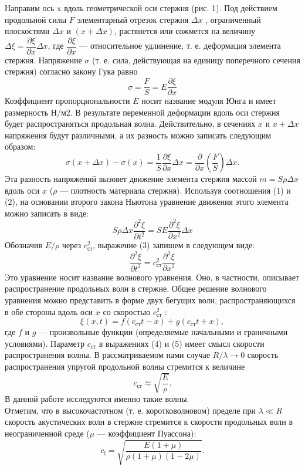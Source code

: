 \documentclass[a4paper, 10pt]{article}%
\begin{document}
Направим ось x вдоль геометрической оси стержня (рис. 1).
Под действием
продольной силы $F$ элементарный отрезок стержня $\Delta x$ , ограниченный
плоскостями $\Delta x$ и $(x+\Delta x)$, растянется или сожмется на величину $\Delta\xi=\dfrac{\partial\xi}{\partial x}\Delta x$, где $\dfrac{\partial\xi}{\partial x}$ — относительное удлинение, т. е. деформация элемента стержня. Напряжение $\sigma$ (т. е. сила, действующая на единицу поперечного
сечения стержня) согласно закону Гука равно
\begin{equation}
\sigma=\frac{F}{S}=E\dfrac{\partial\xi}{\partial x}
\end{equation}
Коэффициент пропорциональности $E$ носит название модуля Юнга и имеет размерность Н/м2. В результате переменной деформации вдоль оси стержня будет распространяться
продольная волна. Действительно, в сечениях $x$ и $x+\Delta x$
напряжения будут различными, а их разность можно записать следующим
образом: 
\begin{equation}
\sigma(x+\Delta x)-\sigma(x)=\frac{1}{S}\dfrac{\partial\xi}{\partial x}\Delta x=\frac{\partial}{\partial x}\left(\frac{F}{S}\right)\Delta x.
\end{equation}
Эта разность напряжений вызовет движение элемента стержня массой
$m=S\rho\Delta x$ вдоль оси $x$ ($\rho$ — плотность материала стержня). Используя
соотношения (1) и (2), на основании второго закона Ньютона уравнение
движения этого элемента можно записать в виде: 
\begin{equation}
S\rho\Delta x\dfrac{\partial^2\xi}{\partial t^2}=SE\dfrac{\partial^2\xi}{\partial x^2}\Delta x
\end{equation}
Обозначив $E/\rho$ через $c^2_{\text{ст}}$, выражение (3) запишем в следующем виде: 
\begin{equation}
\dfrac{\partial^2\xi}{\partial t^2}=c^2_{\text{ст}}\dfrac{\partial^2\xi}{\partial x^2}
\end{equation}
Это уравнение носит название волнового  уравнения. Оно, в частности,
описывает распространение продольных волн в стержне. Общее решение
волнового уравнения можно представить в форме двух бегущих волн, распространяющихся в обе стороны вдоль оси $x$ со скоростью
$c^2_{\text{ст}}$ :
\begin{equation}
\xi(x,t)=f(c_{\text{ст}}t-x)+g(c_{\text{ст}}t+x),
\end{equation}
где $f$ и $g$ — произвольные функции (определяемые начальными и граничными
условиями).
Параметр $c_{\text{ст}}$ в выражениях (4) и (5) имеет смысл скорости распространения волны. В рассматриваемом нами случае $R/\lambda\rightarrow 0$ скорость распространения
упругой продольной волны стремится к величине
\begin{equation}
c_{\text{ст}}\approx\sqrt{\dfrac{E}{\rho}}.
\end{equation}
В данной работе исследуются именно такие волны. \\
Отметим, что в высокочастотном (т. е. коротковолновом) пределе
при $\lambda\ll R$ скорость акустических волн в стержне стремится к скорости продольных волн в неограниченной среде ($\mu$ — коэффициент Пуассона): 
\begin{equation}
c_{\text{i}}=\sqrt{\dfrac{E(1+\mu)}{\rho(1+\mu)(1-2\mu)}}.
\end{equation}
\end{document}

